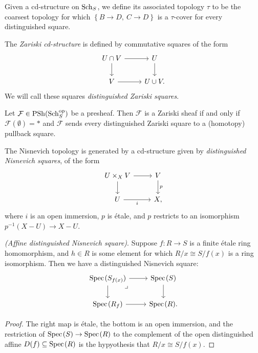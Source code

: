\documentclass[11pt]{amsart}
\renewcommand{\Pre}{\mathrm{PSh}}
\begin{document}
\begin{terminology} Given a cd-structure on $\mathrm{Sch}_S$, we define its associated topology $\tau$ to be the coarsest topology for which $\left\{ B\to D,\ C\to D \right\}$ is a $\tau$-cover for every distinguished square.
\end{terminology}



\begin{example} The \textit{Zariski cd-structure} is defined by commutative squares of the form
\[\begin{tikzcd}
    U\cap V\rar\dar & U\dar\\
    V\rar & U\cup V.
\end{tikzcd} \]
We will call these squares \textit{distinguished Zariski squares}.
\end{example}


\begin{theorem} Let $\mathcal{F} \in \Pre(\Sch_S^\op)$ be a presheaf. Then $\mathcal{F}$ is a Zariski sheaf if and only if $\mathcal{F}(\emptyset) = \ast$ and $\mathcal{F}$ sends every distinguished Zariski square to a (homotopy) pullback square.
\end{theorem}






\begin{example} The Nisnevich topology is generated by a cd-structure given by \textit{distinguished Nisnevich squares}, of the form
\[ \begin{tikzcd}
    U \times_X V\rar\dar & V\dar["p" right]\\
    U\rar["i" below] & X,
\end{tikzcd} \]
where $i$ is an open immersion, $p$ is \'etale, and $p$ restricts to an isomorphism $p^{-1}(X-U)\to X-U$.
\end{example}

\begin{example}\label{ex:affine-distinguished-nisnevich-square} \textit{(Affine distinguished Nisnevich square)}. Suppose $f: R \to S$ is a finite \'etale ring homomorphism, and $h\in R$ is some element for which $R/x \cong S/f(x)$ is a ring isomorphism. Then we have a distinguished Nisnevich square:
\[ \begin{tikzcd}
    \Spec(S_{f(x)})\rar\dar\pb & \Spec(S)\dar\\
    \Spec(R_f)\rar & \Spec(R).
\end{tikzcd} \]
\end{example}
\begin{proof} The right map is \'etale, the bottom is an open immersion, and the restriction of $\text{Spec}\hspace{0.1em}(S) \to \text{Spec}\hspace{0.1em}(R)$ to the complement of the open distinguished affine $D(f) \subseteq \text{Spec}\hspace{0.1em}(R)$ is the hypyothesis that $R/x \cong S/f(x)$.
\end{proof}
\end{document}
